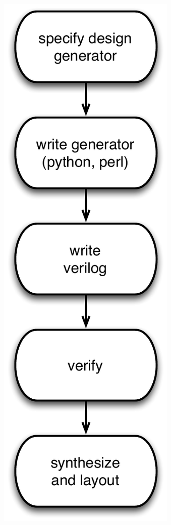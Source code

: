 \documentclass[xcolor=pdflatex,dvipsnames,table]{beamer}
\begin{document}
\begin{frame}
\begin{columns}

\begin{center}
\includegraphics[height=0.9\textheight]{figs/traditional-generator-design-process.pdf}
\end{center}

\end{columns}

\end{frame}
\end{document}
